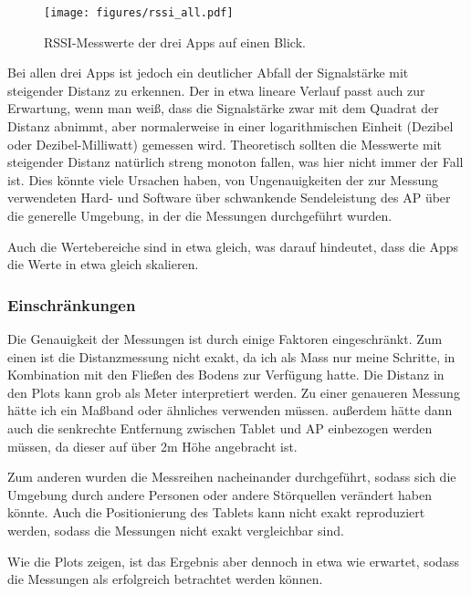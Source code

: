 \begin{figure}[h]
    \centering
    \texttt{[image: figures/rssi\_all.pdf]}
    \caption{RSSI-Messwerte der drei Apps auf einen Blick.}
    \label{rssi}
\end{figure}

Bei allen drei Apps ist jedoch ein deutlicher Abfall der Signalstärke mit steigender Distanz zu erkennen. Der in etwa lineare Verlauf passt auch zur Erwartung, wenn man weiß, dass die Signalstärke zwar mit dem Quadrat der Distanz abnimmt, aber normalerweise in einer logarithmischen Einheit (Dezibel oder Dezibel-Milliwatt) gemessen wird. Theoretisch sollten die Messwerte mit steigender Distanz natürlich streng monoton fallen, was hier nicht immer der Fall ist. Dies könnte viele Ursachen haben, von Ungenauigkeiten der zur Messung verwendeten Hard- und Software über schwankende Sendeleistung des AP über die generelle  Umgebung, in der die Messungen durchgeführt wurden.


Auch die Wertebereiche sind in etwa gleich, was darauf hindeutet, dass die Apps die Werte in etwa gleich skalieren.

\subsubsection*{Einschränkungen}
Die Genauigkeit der Messungen ist durch einige Faktoren eingeschränkt. Zum einen ist die Distanzmessung nicht exakt, da ich als Mass nur meine Schritte, in Kombination mit den Fließen des Bodens zur Verfügung hatte. Die Distanz in den Plots kann grob als Meter interpretiert werden. Zu einer genaueren Messung hätte ich ein Maßband oder ähnliches verwenden müssen. außerdem hätte dann auch die senkrechte Entfernung zwischen Tablet und AP einbezogen werden müssen, da dieser auf über 2m Höhe angebracht ist.

Zum anderen wurden die Messreihen nacheinander durchgeführt, sodass sich die Umgebung durch andere Personen oder andere Störquellen verändert haben könnte. Auch die Positionierung des Tablets kann nicht exakt reproduziert werden, sodass die Messungen nicht exakt vergleichbar sind.

Wie die Plots zeigen, ist das Ergebnis aber dennoch in etwa wie erwartet, sodass die Messungen als erfolgreich betrachtet werden können.


